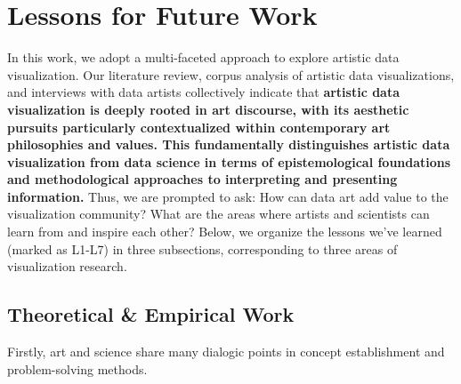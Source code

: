 \section{Lessons for Future Work}
\label{sec:discuss}

In this work, we adopt a multi-faceted approach to explore artistic data visualization. Our literature review, corpus analysis of artistic data visualizations, and interviews with data artists collectively indicate that \textbf{artistic data visualization is deeply rooted in art discourse, with its aesthetic pursuits particularly contextualized within contemporary art philosophies and values. This fundamentally distinguishes artistic data visualization from data science in terms of epistemological foundations and methodological approaches to interpreting and presenting information.} 
Thus, we are prompted to ask: How can data art add value to the visualization community? What are the areas where artists and scientists can learn from and inspire each other?
Below, we organize the lessons we've learned (marked as L1-L7) in three subsections, corresponding to three areas of visualization research. 

\subsection{Theoretical \& Empirical Work}

Firstly, art and science share many dialogic points in concept establishment and problem-solving methods.

